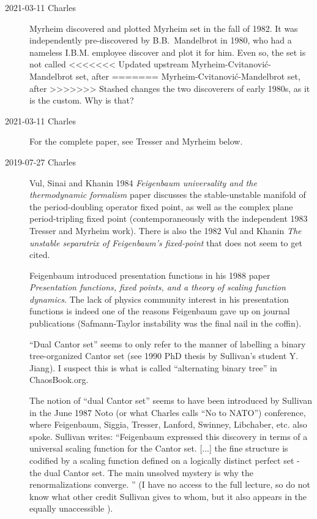 \begin{description}
  \item[2021-03-11 Charles]
Myrheim discovered and plotted Myrheim set in the fall of 1982.
It was independently pre-discovered by B.B.~Mandelbrot in 1980, who had a
nameless I.B.M. employee discover and plot it for him. Even so, the set
is not called
<<<<<<< Updated upstream
Myrheim-Cvitanovi\'c-Mandelbrot set, after
=======
Myrheim-Cvitanovi\'c-Mandelbrot set, after
>>>>>>> Stashed changes
the two discoverers of early 1980s, as it is the custom. Why is that?
  \item[2021-03-11 Charles]
For the complete paper, see {Tresser and Myrheim} below.
  \item[2019-07-27 Charles]
Vul, Sinai and Khanin 1984 {\em Feigenbaum universality and
the thermodynamic formalism} paper discusses the stable-unstable manifold
of the period-doubling operator fixed point, as well as the complex plane
period-tripling fixed point (contemporaneously with the independent 1983
Tresser and Myrheim work). There is also the
1982 Vul and Khanin {\em The unstable separatrix of
{Feigenbaum}'s fixed-point} that does not seem to get cited.

Feigenbaum introduced presentation functions in his 1988
paper {\em Presentation functions, fixed points, and a
theory of scaling function dynamics}. The lack of physics community
interest in his presentation functions is indeed one of the reasons
Feigenbaum gave up on journal publications
(Safmann-Taylor instability was the final nail in the
coffin).

``Dual Cantor set'' {seems to only} refer to the manner of labelling a
binary tree-organized Cantor set (see 1990 PhD thesis by Sullivan's
student
{Y. Jiang}). I suspect this is what is called ``alternating  binary
tree'' in
{ChaosBook.org}.

The notion of ``dual Cantor set'' seems to have been introduced by
Sullivan in the June 1987 Noto (or what Charles calls ``No
to NATO'') conference, where Feigenbaum, Siggia,
Tresser, Lanford, Swinney, Libchaber, etc. also spoke. Sullivan
writes: ``Feigenbaum expressed this discovery in terms of a universal
scaling function for the Cantor set. [...] the fine structure is codified
by a scaling function defined on a logically distinct perfect set - the
dual Cantor set. The main unsolved mystery is why the renormalizations
converge. '' (I have no access to the full lecture, so do not know what
other credit Sullivan gives to whom, but it also appears in the equally
unaccessible ).


\end{description}

